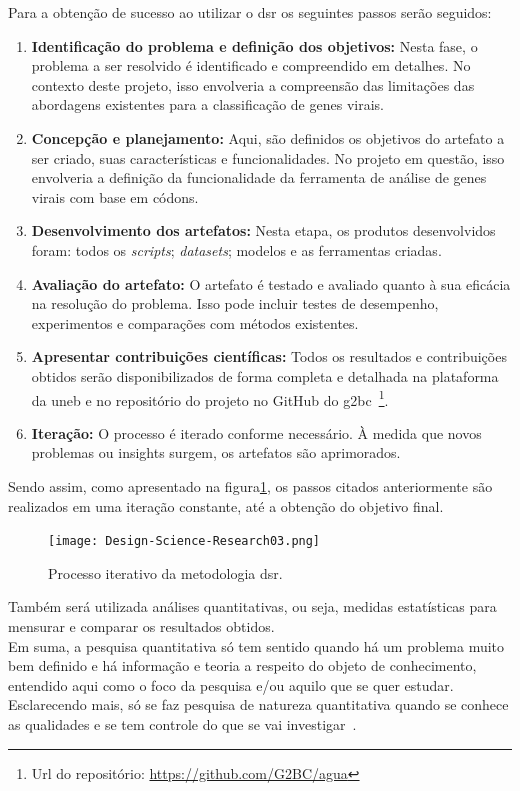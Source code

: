 Para a obtenção de sucesso ao utilizar o \gls{dsr} os seguintes passos serão seguidos:
\begin{enumerate}
  \item \textbf{Identificação do problema e definição dos objetivos:} Nesta fase, o problema a ser resolvido é identificado e compreendido em detalhes. No contexto deste projeto, isso envolveria a compreensão das limitações das abordagens existentes para a classificação de genes virais.
  \item \textbf{Concepção e planejamento:} Aqui, são definidos os objetivos do artefato a ser criado, suas características e funcionalidades. No projeto em questão, isso envolveria a definição da funcionalidade da ferramenta de análise de genes virais com base em códons.
  \item \textbf{Desenvolvimento dos artefatos:} Nesta etapa, os produtos desenvolvidos foram: todos os \textit{scripts}; \textit{datasets}; modelos e as ferramentas criadas.
  \item \textbf{Avaliação do artefato:} O artefato é testado e avaliado quanto à sua eficácia na resolução do problema. Isso pode incluir testes de desempenho, experimentos e comparações com métodos existentes.
  \item \textbf{Apresentar contribuições científicas:} Todos os resultados e contribuições obtidos serão disponibilizados de forma completa e detalhada na plataforma da \gls{uneb} e no repositório do projeto no GitHub do \gls{g2bc}~\footnote{Url do repositório: \url{https://github.com/G2BC/agua}}.
  \item \textbf{Iteração:} O processo é iterado conforme necessário. À medida que novos problemas ou insights surgem, os artefatos são aprimorados.
\end{enumerate}

Sendo assim, como apresentado na figura\ref{fig:processoDSR}, os passos citados anteriormente são realizados em uma iteração constante, até a obtenção do objetivo final.

\begin{figure}[htb]
  \centering
  \caption{Processo iterativo da metodologia \gls{dsr}.}
  \texttt{[image: Design-Science-Research03.png]}
  ~\label{fig:processoDSR}
\end{figure}

Também será utilizada análises quantitativas, ou seja, medidas estatísticas para mensurar e comparar os resultados obtidos.\\
Em suma, a pesquisa quantitativa só tem sentido quando há um problema muito bem definido e há informação e teoria a respeito do objeto de conhecimento, entendido aqui como o foco da pesquisa e/ou aquilo que se quer estudar. Esclarecendo mais, só se faz pesquisa de natureza quantitativa quando se conhece as qualidades e se tem controle do que se vai investigar~\cite{da_silva_pesquisa_2014}.

